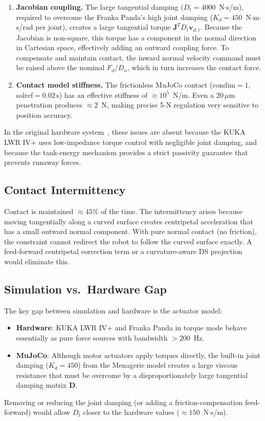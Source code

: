 \documentclass[conference]{IEEEtran}
\newcommand{\JJ}{\mathbf{J}}
\newcommand{\DD}{\mathbf{D}}
\begin{document}
\begin{enumerate}
  \item \textbf{Jacobian coupling.} The large tangential damping ($D_t = 4000$~N$\cdot$s/m),
        required to overcome the Franka Panda's high joint damping
        ($K_d = 450$~N$\cdot$m$\cdot$s/rad per joint), creates a large
        tangential torque $\JJ^T D_t \mathbf{v}_{d,t}$. Because the Jacobian
        is non-square, this torque has a component in the normal direction in
        Cartesian space, effectively adding an outward coupling force. To
        compensate and maintain contact, the inward normal velocity command
        must be raised above the nominal $F_d/D_n$, which in turn increases
        the contact force.

  \item \textbf{Contact model stiffness.} The frictionless MuJoCo contact
        (condim$=1$, solref$= 0.02\,\text{s}$) has an effective stiffness of
        $\approx 10^5$~N/m. Even a $20\,\mu$m penetration produces $\approx 2$~N,
        making precise 5-N regulation very sensitive to position accuracy.
\end{enumerate}

In the original hardware system~\cite{amanhoud2019}, these issues are absent
because the KUKA LWR IV+ uses low-impedance torque control with negligible joint
damping, and because the tank-energy mechanism provides a strict passivity
guarantee that prevents runaway forces.

\subsection{Contact Intermittency}

Contact is maintained $\approx 45\%$ of the time. The intermittency arises because
moving tangentially along a curved surface creates centripetal acceleration that
has a small outward normal component. With pure normal contact (no friction),
the constraint cannot redirect the robot to follow the curved surface exactly.
A feed-forward centripetal correction term or a curvature-aware DS
projection~\cite{amanhoud2019} would eliminate this.

\subsection{Simulation vs.\ Hardware Gap}

The key gap between simulation and hardware is the actuator model:
\begin{itemize}
  \item \textbf{Hardware}: KUKA LWR IV+ and Franka Panda in torque mode behave
        essentially as pure force sources with bandwidth $> 200$~Hz.
  \item \textbf{MuJoCo}: Although motor actuators apply torques directly, the
        built-in joint damping ($K_d = 450$) from the Menagerie model creates a
        large viscous resistance that must be overcome by a disproportionately
        large tangential damping matrix $\DD$.
\end{itemize}
Removing or reducing the joint damping (or adding a friction-compensation
feed-forward) would allow $D_t$ closer to the hardware values ($\approx 150$~N$\cdot$s/m).
\end{document}
